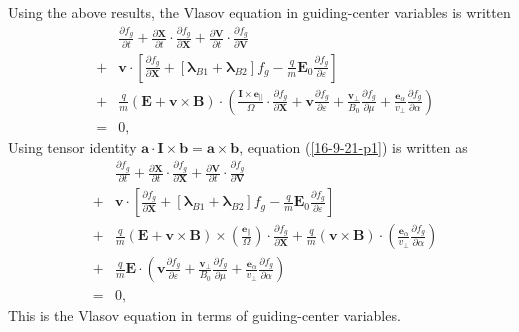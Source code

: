 \documentclass{article}
\newcommand{\tmmathbf}[1]{\ensuremath{\boldsymbol{#1}}}
\begin{document}
Using the above results, the Vlasov equation in guiding-center variables is
written
\begin{eqnarray}
  &  & \frac{\partial f_g}{\partial t} + \frac{\partial \mathbf{X}}{\partial
  t} \cdot \frac{\partial f_g}{\partial \mathbf{X}} + \frac{\partial
  \mathbf{V}}{\partial t} \cdot \frac{\partial f_g}{\partial \mathbf{V}}
  \nonumber\\
  & + & \mathbf{v} \cdot \left[ \frac{\partial f_g}{\partial \mathbf{X}} +
  [\tmmathbf{\lambda}_{B 1} +\tmmathbf{\lambda}_{B 2}] f_g - \frac{q}{m}
  \mathbf{E}_0 \frac{\partial f_g}{\partial \varepsilon} \right] \nonumber\\
  & + & \frac{q}{m} (\mathbf{E}+\mathbf{v} \times \mathbf{B}) \cdot \left(
  \frac{\mathbf{I} \times \tmmathbf{e}_{\parallel}}{\Omega} \cdot
  \frac{\partial f_g}{\partial \mathbf{X}} + \tmmathbf{v} \frac{\partial
  f_g}{\partial \varepsilon} + \frac{\tmmathbf{v}_{\perp}}{B_0} 
  \frac{\partial f_g}{\partial \mu} + \frac{\tmmathbf{e}_{\alpha}}{v_{\perp}} 
  \frac{\partial f_g}{\partial \alpha} \right) \nonumber\\
  & = & 0,  \label{16-9-21-p1}
\end{eqnarray}
Using tensor identity $\mathbf{a} \cdot \tmmathbf{I} \times
\mathbf{b}=\mathbf{a} \times \mathbf{b}$, equation (\ref{16-9-21-p1}) is
written as
\begin{eqnarray}
  &  & \frac{\partial f_g}{\partial t} + \frac{\partial \mathbf{X}}{\partial
  t} \cdot \frac{\partial f_g}{\partial \mathbf{X}} + \frac{\partial
  \mathbf{V}}{\partial t} \cdot \frac{\partial f_g}{\partial \mathbf{V}}
  \nonumber\\
  & + & \mathbf{v} \cdot \left[ \frac{\partial f_g}{\partial \mathbf{X}} +
  [\tmmathbf{\lambda}_{B 1} +\tmmathbf{\lambda}_{B 2}] f_g - \frac{q}{m}
  \mathbf{E}_0 \frac{\partial f_g}{\partial \varepsilon} \right] \nonumber\\
  & + & \frac{q}{m} (\mathbf{E}+\mathbf{v} \times \mathbf{B}) \times \left(
  \frac{\tmmathbf{e}_{\parallel}}{\Omega}  \right) \cdot \frac{\partial
  f_g}{\partial \mathbf{X}} + \frac{q}{m} (\mathbf{v} \times \mathbf{B}) \cdot
  \left( \frac{\tmmathbf{e}_{\alpha}}{v_{\perp}}  \frac{\partial f_g}{\partial
  \alpha} \right) \nonumber\\
  & + & \frac{q}{m} \mathbf{E} \cdot \left( \mathbf{v} \frac{\partial
  f_g}{\partial \varepsilon} + \frac{\mathbf{v}_{\perp}}{B_0}  \frac{\partial
  f_g}{\partial \mu} + \frac{\tmmathbf{e}_{\alpha}}{v_{\perp}}  \frac{\partial
  f_g}{\partial \alpha} \right) \nonumber\\
  & = & 0,  \label{16-10-2-p1}
\end{eqnarray}
This is the Vlasov equation in terms of guiding-center variables.
\end{document}
